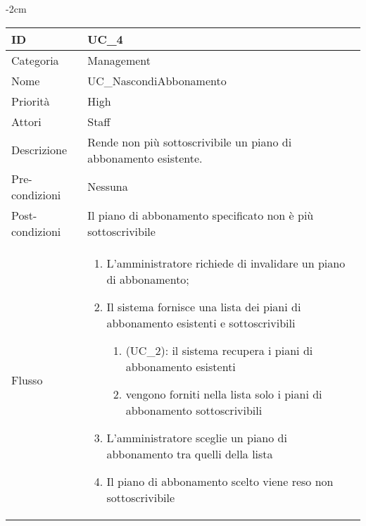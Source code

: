 \begin{center}
\begin{table}[bp]
    \centering
    \addtolength{\leftskip} {-2cm}
\begin{tabular}{ |p{2.6cm}|p{13cm}|  }
\hline
ID & UC\_4 \\\hline
Categoria & Management\\\hline
Nome & UC\_NascondiAbbonamento\\\hline
Priorità & High \\\hline
Attori &  Staff \\\hline
Descrizione & Rende non più sottoscrivibile un piano di abbonamento esistente.\\\hline
Pre-condizioni &  Nessuna \\\hline
Post-condizioni &  Il piano di abbonamento specificato non è più sottoscrivibile\\\hline
Flusso &  	\begin{enumerate}
		\item L'amministratore richiede di invalidare un piano di abbonamento;
		\item Il sistema fornisce una lista dei piani di abbonamento esistenti e sottoscrivibili
			\begin{enumerate}[  ]
			\item (UC\_2): il sistema recupera i piani di abbonamento esistenti
			\item vengono forniti nella lista solo i piani di abbonamento sottoscrivibili
			\end{enumerate}
		\item L'amministratore sceglie un piano di abbonamento tra quelli della lista
		\item Il piano di abbonamento scelto viene reso non sottoscrivibile
		\end{enumerate}\\\hline
\end{tabular}
\label{table_use_case:4}\newline
\end{table}


\end{center}
